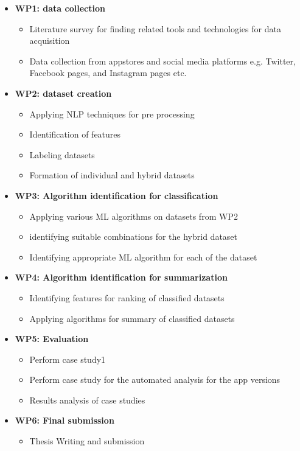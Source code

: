 \begin{itemize}
\item{\textbf{WP1: data collection}}
\begin{itemize}
\item{Literature survey for finding related tools and technologies for data acquisition}
\item{Data collection from appstores and social media platforms e.g. Twitter, Facebook pages, and Instagram pages etc.\\}
\end{itemize}

\item{\textbf{WP2: dataset creation}}
\begin{itemize}
\item{Applying NLP techniques for pre processing}
\item{Identification of features}
\item{Labeling datasets}
\item{Formation of individual and hybrid datasets\\}
\end{itemize}

\item{\textbf{WP3: Algorithm identification for classification}}
\begin{itemize}
\item{Applying various ML algorithms on datasets from WP2}
\item{identifying suitable combinations for the hybrid dataset}
\item{Identifying appropriate ML algorithm for each of the dataset\\}
\end{itemize}

\item{\textbf{WP4: Algorithm identification for summarization}}
\begin{itemize}\item{ Identifying features for ranking of classified datasets}
\item{ Applying algorithms for summary of classified datasets\\}
\end{itemize}

\item{\textbf{WP5: Evaluation}}
\begin{itemize}
\item{Perform case study1}
\item{Perform case study for the automated analysis for the app versions}
\item{Results analysis of case studies\\}
\end{itemize}

\item{\textbf{WP6: Final submission}}
\begin{itemize}
\item{Thesis Writing and submission}
\end{itemize}
\end{itemize}
